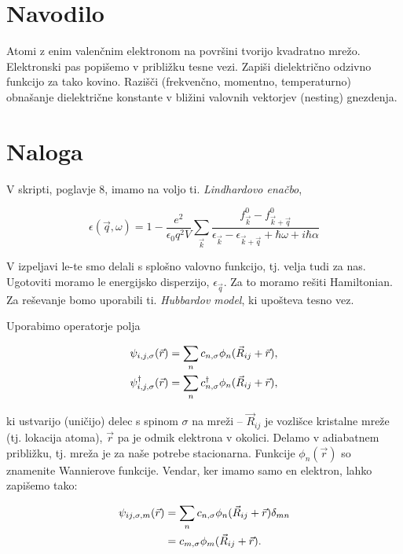 \documentclass[a4paper, 12pt]{article}
\newcommand{\vq}{
	\ensuremath{\vec{q}}
}
\newcommand{\w}{
	\ensuremath{\omega}
}
\newcommand{\e}{
	\ensuremath{\epsilon}
}
\renewcommand{\ni}{
	\noindent
}
\begin{document}
\section{Navodilo}

Atomi z enim valen\v cnim elektronom na povr\v sini tvorijo kvadratno mre\v zo. Elektronski pas
popi\v semo v pribli\v zku tesne vezi. Zapi\v si dielektri\v cno odzivno funkcijo za tako kovino.
Razi\v s\v ci (frekven\v cno, momentno, temperaturno) obna\v sanje dielektri\v cne konstante v
bli\v zini valovnih vektorjev (nesting) gnezdenja.

\section{Naloga}

V skripti, poglavje 8, imamo na voljo ti. \emph{Lindhardovo ena\v cbo},

\begin{equation}
	\e (\vq, \w) = 1 - \frac{e^2}{\e_0 q^2 V} \sum_{\vec{k}} \frac{f_{\vec{k}}^0 -
		f^0_{\vec{k}+\vq}} {\e_{\vec{k}} - \e_{\vec{k}+\vq} + \hbar\w + i\hbar\alpha}
	\label{lindhard}
\end{equation}

V izpeljavi le-te smo delali s splo\v sno valovno funkcijo, tj. velja tudi za nas. Ugotoviti moramo
le energijsko disperzijo, $\e_{\vq}$. Za to moramo re\v siti Hamiltonian. Za re\v sevanje bomo
uporabili ti. \emph{Hubbardov model}, ki upo\v steva tesno vez.

Uporabimo operatorje polja

\begin{align}
	\psi_{i,j,\sigma}(\vec{r}) &= \sum_n c_{n,\sigma} \phi_n (\vec{R}_{ij} + \vec{r}),\notag  \\
	\psi^\dagger_{i,j,\sigma}(\vec{r}) &= \sum_n c^\dagger_{n,\sigma} \phi_n (\vec{R}_{ij} +
		\vec{r}),
	\label{polje}
\end{align}

\ni ki ustvarijo (uni\v cijo) delec s spinom $\sigma$ na mre\v zi -- $\vec{R}_{ij}$ je vozli\v sce
kristalne mre\v ze (tj. lokacija atoma), $\vec{r}$ pa je odmik elektrona v okolici. Delamo v
adiabatnem pribli\v zku, tj. mre\v za je za na\v se potrebe stacionarna. Funkcije $\phi_n (\vec{r})$
so znamenite Wannierove funkcije. Vendar, ker imamo samo en elektron, lahko zapi\v semo tako:

\begin{align}
	\psi_{ij,\sigma,m}(\vec{r}) &= \sum_n c_{n,\sigma} \phi_n (\vec{R}_{ij} + \vec{r})
		\delta_{mn} \notag \\
	&= c_{m,\sigma} \phi_m (\vec{R}_{ij} + \vec{r}).
\end{align}
\end{document}
